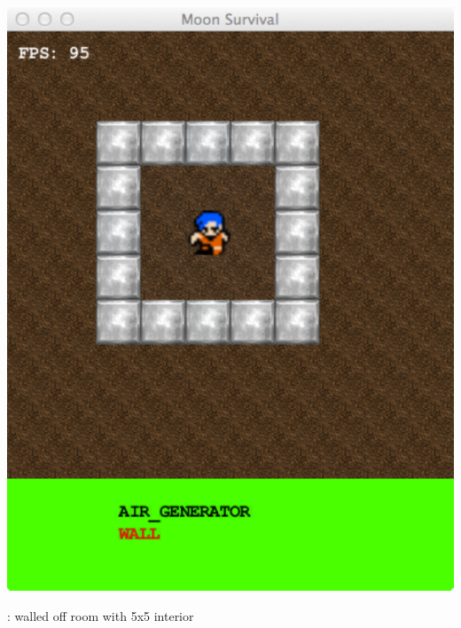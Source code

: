 \begin{marginfigure}
	\includegraphics{res/space_base_prototype/empty_room.pdf}
	\caption{
	\prototypeSiddall : walled off room with 5x5 interior	}
	\label{fig:SpaceBaseWithRoom}
\end{marginfigure}

